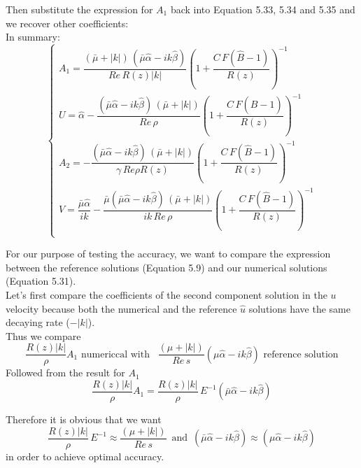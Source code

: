Then substitute the expression for $A_1$ back into Equation 5.33, 5.34 and 5.35 and we recover other coefficients:\\
In summary:
\begin{equation}
\begin{cases}
A_1 = \dfrac{(\bar{\mu} + |k|)\,(\bar{\mu} \hat{\alpha} - ik \hat{\beta})}{Re \, R(z) |k|}(1 + \dfrac{C \, F(\hat{B} - 1)}{R(z)})^{-1}\\
U = \hat{\alpha} - \dfrac{(\bar{\mu} \hat{\alpha} - ik \hat{\beta}) \, (\bar{\mu} + |k|)}{Re \, \rho} (1 + \dfrac{C\,F(\hat{B} - 1)}{R(z)})^{-1}\\
A_2 = - \dfrac{(\bar{\mu} \hat{\alpha} - ik \hat{\beta}) \, (\bar{\mu} + |k|)}{\gamma \, Re \rho R(z)}(1 + \dfrac{C\,F(\hat{B} - 1)}{R(z)})^{-1}\\
V = \dfrac{\bar{\mu} \hat{\alpha}}{i k} - \dfrac{\bar{\mu}(\bar{\mu} \hat{\alpha} - ik \hat{\beta}) \, (\bar{\mu} + |k|)}{ik \, Re \, \rho} (1 + \dfrac{C\,F(\hat{B} - 1)}{R(z)})^{-1}\\
\end{cases}
\end{equation}

For our purpose of testing the accuracy, we want to compare the expression between the reference solutions (Equation 5.9) and our numerical solutions (Equation 5.31).\\

Let's first compare the coefficients of the second component solution in the $u$ velocity because both the numerical and the reference $\hat{u}$ solutions have the same decaying rate ($- |k|$).\\

Thus we compare
\begin{equation*}
\dfrac{R(z) |k|}{\rho} A_1 \text{ numericcal with } \, \, \, \dfrac{(\mu + |k|)}{Re \, s} (\mu \hat{\alpha} - ik \hat{\beta}) \text{ reference solution}
\end{equation*}
Followed from the result for $A_1$
\begin{equation*}
\dfrac{R(z) |k|}{\rho} A_1 = \dfrac{R(z) |k|}{\rho} \, E^{-1} (\bar{\mu} \hat{\alpha} - ik \hat{\beta})
\end{equation*}

Therefore it is obvious that we want 
\begin{equation}
\dfrac{R(z) |k|}{\rho} \, E^{-1} \approx \dfrac{(\mu + |k|)}{Re \, s} \, \text{ and } \, (\bar{\mu} \hat{\alpha} - ik \hat{\beta}) \approx (\mu \hat{\alpha} - ik \hat{\beta})
\end{equation}
in order to achieve optimal accuracy.\\

